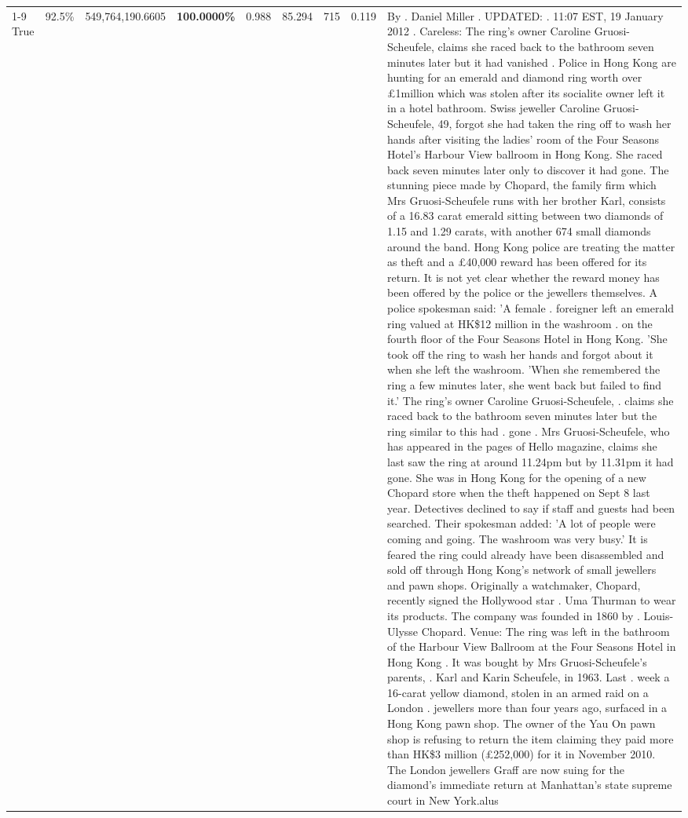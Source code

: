 \begin{table}[H]
\begin{tabular}{lllrlllll}
\cline{1-9} \cline{2-9}
True & 92.5\% & 549,764,190.6605 & \bfseries \color{red} 100.0000\% & 0.988 & 85.294 & 715 & 0.119 & By . Daniel Miller . UPDATED: . 11:07 EST, 19 January 2012 . Careless: The ring's owner Caroline Gruosi-Scheufele, claims she raced back to the bathroom seven minutes later but it had vanished . Police in Hong Kong are hunting for an emerald and diamond ring worth over £1million which was stolen after its socialite owner left it in a hotel bathroom. Swiss jeweller Caroline Gruosi-Scheufele, 49, forgot she had taken the ring off to wash her hands after visiting the ladies' room of the Four Seasons Hotel's Harbour View ballroom in Hong Kong. She raced back seven minutes later only to discover it had gone. The stunning piece made by Chopard, the family firm which Mrs Gruosi-Scheufele runs with her brother Karl, consists of a 16.83 carat emerald sitting between two diamonds of 1.15 and 1.29 carats, with another 674 small diamonds around the band. Hong Kong police are treating the matter as theft and a £40,000 reward has been offered for its return. It is not yet clear whether the reward money has been offered by the police or the jewellers themselves. A police spokesman said: 'A female . foreigner left an emerald ring valued at HK\$12 million in the washroom . on the fourth floor of the Four Seasons Hotel in Hong Kong. 'She took off the ring to wash her hands and forgot about it when she left the washroom. 'When she remembered the ring a few minutes later, she went back but failed to find it.' The ring's owner Caroline Gruosi-Scheufele, . claims she raced back to the bathroom seven minutes later but the ring similar to this had . gone . Mrs Gruosi-Scheufele, who has appeared in the pages of Hello magazine, claims she last saw the ring at around 11.24pm but by 11.31pm it had gone. She was in Hong Kong for the opening of a new Chopard store when the theft happened on Sept 8 last year. Detectives declined to say if staff and guests had been searched. Their spokesman added: 'A lot of people were coming and going. The washroom was very busy.' It is feared the ring could already have been disassembled and sold off through Hong Kong's network of small jewellers and pawn shops. Originally a watchmaker, Chopard, recently signed the Hollywood star . Uma Thurman to wear its products. The company was founded in 1860 by . Louis-Ulysse Chopard. Venue: The ring was left in the bathroom of the Harbour View Ballroom at the Four Seasons Hotel in Hong Kong . It was bought by Mrs Gruosi-Scheufele's  parents, . Karl and Karin Scheufele, in 1963. Last . week a 16-carat yellow diamond, stolen in an armed raid on a London . jewellers more than four years ago, surfaced in a Hong Kong pawn shop. The owner of the Yau On pawn shop is refusing to return the item claiming they paid more than HK\$3 million (£252,000) for it in November 2010. The London jewellers Graff are now suing for the diamond’s immediate return at Manhattan’s state supreme court in New York.alus \\

\end{tabular}
\end{table}
